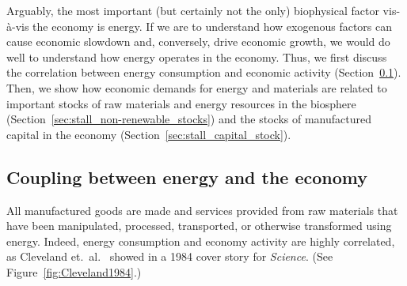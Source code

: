 Arguably, the most important (but certainly not the only) biophysical factor 
vis-\`{a}-vis the economy is energy.
If we are to understand how exogenous factors can cause economic slowdown
and, conversely, drive economic growth,
we would do well to understand how energy operates in the economy.
Thus, we first discuss the correlation 
between energy consumption and economic activity 
(Section~\ref{sec:energy-economy_coupling}).
Then, we show how economic demands for energy and materials
are related to important stocks 
of raw materials and energy resources in the biosphere 
(Section~\ref{sec:stall_non-renewable_stocks})
and the stocks of manufactured capital in the economy
(Section~\ref{sec:stall_capital_stock}).


\subsection{Coupling between energy and the economy}
\label{sec:energy-economy_coupling}

All manufactured goods are made and services provided
from raw materials that have been
manipulated, processed, transported, or otherwise transformed using energy.
Indeed, energy consumption and economy activity are highly correlated,
as Cleveland et.\ al.~\cite{Cleveland:1984aa} showed in a 1984 cover story for \emph{Science}. 
(See Figure~\ref{fig:Cleveland1984}.)

